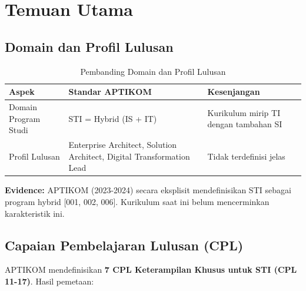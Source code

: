 \documentclass[12pt,a4paper]{report}
\begin{document}
\newpage

\chapter{Temuan Utama}

\section{Domain dan Profil Lulusan}

\begin{table}[h!]
\centering
\renewcommand{\arraystretch}{1.3}
\begin{tabular}{>{\raggedright\arraybackslash}p{4.5cm} >{\raggedright\arraybackslash}p{5cm} >{\centering\arraybackslash}p{4cm}}
\toprule
\rowcolor{secondary}\textbf{Aspek} & \textbf{Standar APTIKOM} & \textbf{Kesenjangan} \\ \midrule
Domain Program Studi & STI = Hybrid (IS + IT) & Kurikulum mirip TI dengan tambahan SI \\ \midrule
Profil Lulusan & Enterprise Architect, Solution Architect, Digital Transformation Lead & Tidak terdefinisi jelas \\ \bottomrule
\end{tabular}
\caption{Pembanding Domain dan Profil Lulusan}
\label{tab:domain}
\end{table}

\textbf{Evidence:} APTIKOM (2023-2024) secara eksplisit mendefinisikan STI sebagai program hybrid [001, 002, 006]. Kurikulum saat ini belum mencerminkan karakteristik ini.

\newpage

\section{Capaian Pembelajaran Lulusan (CPL)}

APTIKOM mendefinisikan \textbf{7 CPL Keterampilan Khusus untuk STI (CPL 11-17)}. Hasil pemetaan:
\end{document}
